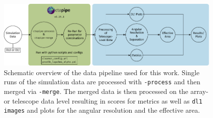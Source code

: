 \begin{figure}
    \centering
    \includegraphics[width=\textwidth]{graphics/data_pipeline.pdf}
    \caption{Schematic overview of the data pipeline used for this work. Single runs of the simulation
    data are processed with \ctapipe\texttt{-process} and then merged via \ctapipe\texttt{-merge}.
    The merged data is then processed on the array- or telescope data level resulting in scores for metrics
    as well as \texttt{dl1 images} and plots for the angular resolution and the effective area.}
    \label{fig:data-processing}
\end{figure}

